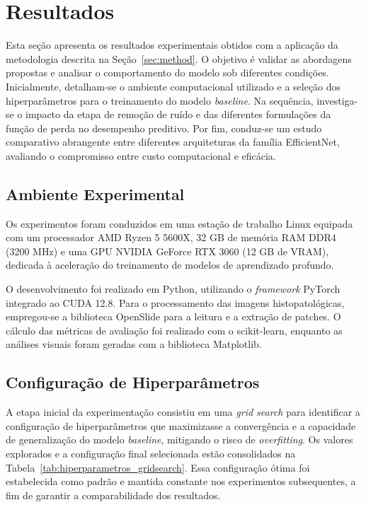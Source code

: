 \chapter{Resultados}
\label{cap:resultados}

Esta seção apresenta os resultados experimentais obtidos com a aplicação da metodologia descrita na Seção~\ref{sec:method}. O objetivo é validar as abordagens propostas e analisar o comportamento do modelo sob diferentes condições. Inicialmente, detalham-se o ambiente computacional utilizado e a seleção dos hiperparâmetros para o treinamento do modelo \textit{baseline}. Na sequência, investiga-se o impacto da etapa de remoção de ruído e das diferentes formulações da função de perda no desempenho preditivo. Por fim, conduz-se um estudo comparativo abrangente entre diferentes arquiteturas da família EfficientNet, avaliando o compromisso entre custo computacional e eficácia.

\section{Ambiente Experimental}

Os experimentos foram conduzidos em uma estação de trabalho Linux equipada com um processador AMD Ryzen 5 5600X, 32 GB de memória RAM DDR4 (3200 MHz) e uma GPU NVIDIA GeForce RTX 3060 (12 GB de VRAM), dedicada à aceleração do treinamento de modelos de aprendizado profundo.

O desenvolvimento foi realizado em Python, utilizando o \textit{framework} PyTorch integrado ao CUDA 12.8. Para o processamento das imagens histopatológicas, empregou-se a biblioteca OpenSlide para a leitura e a extração de patches. O cálculo das métricas de avaliação foi realizado com o scikit-learn, enquanto as análises visuais foram geradas com a biblioteca Matplotlib.

\section{Configuração de Hiperparâmetros}

A etapa inicial da experimentação consistiu em uma \textit{grid search} para identificar a configuração de hiperparâmetros que maximizasse a convergência e a capacidade de generalização do modelo \textit{baseline}, mitigando o risco de \textit{overfitting}. Os valores explorados e a configuração final selecionada estão consolidados na Tabela~\ref{tab:hiperparametros_gridsearch}. Essa configuração ótima foi estabelecida como padrão e mantida constante nos experimentos subsequentes, a fim de garantir a comparabilidade dos resultados.


